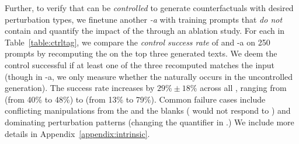 Further, to verify that \sysname can be \emph{controlled} to generate counterfactuals with desired perturbation types, we finetune another \emph{\sysname-a} with training prompts that \emph{do not} contain \tagstrs and quantify the impact of the \tagstrshorts through an ablation study.
For each \tagstr in Table~\ref{table:ctrltag}, we compare the \emph{control success rate} of \sysname and \sysname-a on 250 prompts by recomputing the \tagstrshorts on the top three generated texts.
We deem the control successful if at least one of the three recomputed \tagstrshorts matches the input (though in \sysname-a, we only measure whether the \tagstrshort naturally occurs in the uncontrolled generation).
The success rate increases by $29\% \pm 18\%$ across all \tagstrs, ranging from  (from 40\% to 48\%) to  (from 13\% to 79\%).
Common failure cases include conflicting manipulations from the \tagstrs and the blanks (\eg {} would not respond to ) and dominating perturbation patterns (\eg changing the quantifier in .)
We include more details in Appendix~\ref{appendix:intrinsic}.


